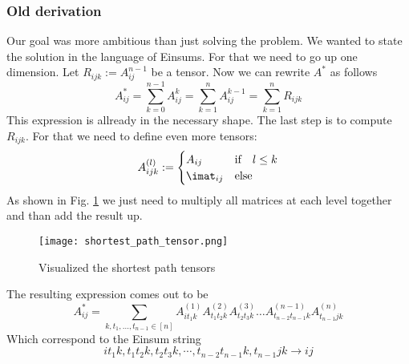 \subsubsection{Old derivation}
Our goal was more ambitious than just solving the problem. We wanted to state the solution in the language of Einsums. For that we need to go up one dimension. Let $R_{ijk} := A^{n-1}_{ij}$ be a tensor. Now we can rewrite $A^*$ as follows
$$A^*_{ij} = \sum_{k=0}^{n-1} A^k_{ij} = \sum_{k=1}^{n}A^{k-1}_{ij} = \sum_{k=1}^{n}R_{ijk}$$
This expression is allready in the necessary shape. The last step is to compute $R_{ijk}$. For that we need to define even more tensors: 
$$A^{(l)}_{ijk} := 
\begin{cases}
    A_{ij} & \textrm{if}\quad l \leq k\\
    \imat_{ij} & \textrm{else}   
\end{cases}
$$
As shown in Fig. \ref*{fig:shortest_path_tensor} we just need to multiply all matrices at each level together and than add the result up.

\begin{figure}[h]
    \texttt{[image: shortest\_path\_tensor.png]}
    \caption{Visualized the shortest path tensors}
    \label{fig:shortest_path_tensor}
\end{figure}

The resulting expression comes out to be
$$A^*_{ij} = \sum_{k, t_1, \dots, t_{n-1} \in [n]} A^{(1)}_{it_1k}A^{(2)}_{t_1t_2k}A^{(3)}_{t_2t_3k}\dots A^{(n-1)}_{t_{n-2}t_{n-1}k}A^{(n)}_{t_{n-1}jk}$$
Which correspond to the Einsum string
$$it_1k, t_1t_2k, t_2t_3k, \cdots, t_{n-2}t_{n-1}k, t_{n-1}jk \to ij$$

